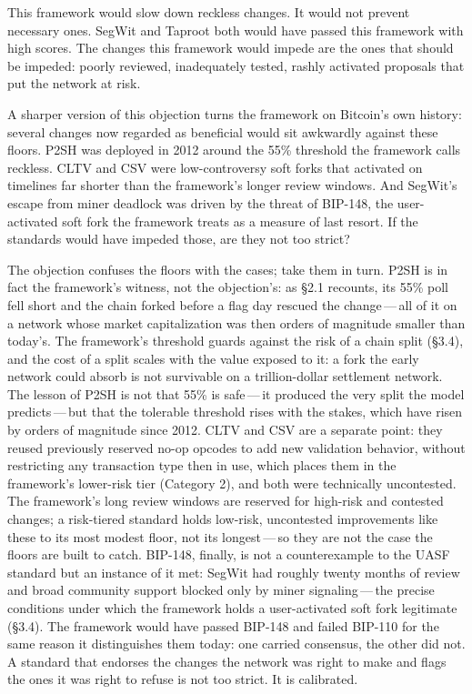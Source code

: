 \documentclass[11pt, twoside, openright]{book}
\newcommand{\sect}[1]{\S#1}
\begin{document}
This framework would slow down reckless changes. It would not prevent necessary ones. SegWit and Taproot both would have passed this framework with high scores. The changes this framework would impede are the ones that should be impeded: poorly reviewed, inadequately tested, rashly activated proposals that put the network at risk.

A sharper version of this objection turns the framework on Bitcoin's own history: several changes now regarded as beneficial would sit awkwardly against these floors. P2SH was deployed in 2012 around the 55\% threshold the framework calls reckless. CLTV and CSV were low-controversy soft forks that activated on timelines far shorter than the framework's longer review windows. And SegWit's escape from miner deadlock was driven by the threat of BIP-148, the user-activated soft fork the framework treats as a measure of last resort. If the standards would have impeded those, are they not too strict?

The objection confuses the floors with the cases; take them in turn. P2SH is in fact the framework's witness, not the objection's: as \sect{2.1} recounts, its 55\% poll fell short and the chain forked before a flag day rescued the change\,---\,all of it on a network whose market capitalization was then orders of magnitude smaller than today's. The framework's threshold guards against the risk of a chain split (\sect{3.4}), and the cost of a split scales with the value exposed to it: a fork the early network could absorb is not survivable on a trillion-dollar settlement network. The lesson of P2SH is not that 55\% is safe\,---\,it produced the very split the model predicts\,---\,but that the tolerable threshold rises with the stakes, which have risen by orders of magnitude since 2012. CLTV and CSV are a separate point: they reused previously reserved no-op opcodes to add new validation behavior, without restricting any transaction type then in use, which places them in the framework's lower-risk tier (Category 2), and both were technically uncontested. The framework's long review windows are reserved for high-risk and contested changes; a risk-tiered standard holds low-risk, uncontested improvements like these to its most modest floor, not its longest\,---\,so they are not the case the floors are built to catch. BIP-148, finally, is not a counterexample to the UASF standard but an instance of it met: SegWit had roughly twenty months of review and broad community support blocked only by miner signaling\,---\,the precise conditions under which the framework holds a user-activated soft fork legitimate (\sect{3.4}). The framework would have passed BIP-148 and failed BIP-110 for the same reason it distinguishes them today: one carried consensus, the other did not. A standard that endorses the changes the network was right to make and flags the ones it was right to refuse is not too strict. It is calibrated.
\end{document}
